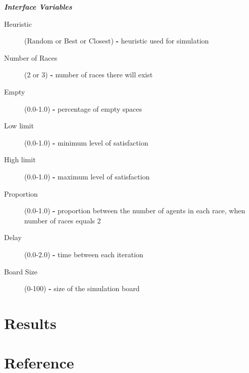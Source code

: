 \documentclass[a4paper,titlepage,11pt]{article}
\begin{document}
\textit{ \textbf{Interface Variables} }

\begin{description}
\item [ Heuristic ] (Random or Best or Closest) \textbf{-} heuristic used for simulation
\item [ Number of Races ] (2 or 3) \textbf{-} number of races there will exist
\item [ Empty ] (0.0-1.0) \textbf{-} percentage of empty spaces
\item [ Low limit ] (0.0-1.0) \textbf{-} minimum level of satisfaction
\item [ High limit ] (0.0-1.0) \textbf{-} maximum level of satisfaction
\item [ Proportion ] (0.0-1.0) \textbf{-} proportion between the number of agents in each race, when number of races equals 2
\item [ Delay ] (0.0-2.0) \textbf{-} time between each iteration
\item [ Board Size ] (0-100) \textbf{-} size of the simulation board
\end{description}

\newpage 

\section{Results}

\section{Reference}
\end{document}
